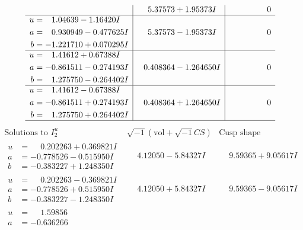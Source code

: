 \documentclass[1p]{elsarticle_modified}
\theoremstyle{definition}
\newcommand{\I}{\sqrt{-1}}
\begin{document}
$$\begin{array}{c|c|c}
 & \phantom{-}5.37573 + 1.95373 I & \phantom{-0.000000 } 0 \\ \hline\begin{aligned}
u &= \phantom{-}1.04639 - 1.16420 I \\
a &= \phantom{-}0.930949 - 0.477625 I \\
b &= -1.221710 + 0.070295 I\end{aligned}
 & \phantom{-}5.37573 - 1.95373 I & \phantom{-0.000000 } 0 \\ \hline\begin{aligned}
u &= \phantom{-}1.41612 + 0.67388 I \\
a &= -0.861511 - 0.274193 I \\
b &= \phantom{-}1.275750 - 0.264402 I\end{aligned}
 & \phantom{-}0.408364 - 1.264650 I & \phantom{-0.000000 } 0 \\ \hline\begin{aligned}
u &= \phantom{-}1.41612 - 0.67388 I \\
a &= -0.861511 + 0.274193 I \\
b &= \phantom{-}1.275750 + 0.264402 I\end{aligned}
 & \phantom{-}0.408364 + 1.264650 I & \phantom{-0.000000 } 0\\
 \hline 
 \end{array}$$\newpage$$\begin{array}{c|c|c}  
\text{Solutions to }I^u_{2}& \I (\text{vol} + \sqrt{-1}CS) & \text{Cusp shape}\\
 \hline 
\begin{aligned}
u &= \phantom{-}0.202263 + 0.369821 I \\
a &= -0.778526 - 0.515950 I \\
b &= -0.383227 + 1.248350 I\end{aligned}
 & \phantom{-}4.12050 - 5.84327 I & \phantom{-}9.59365 + 9.05617 I \\ \hline\begin{aligned}
u &= \phantom{-}0.202263 - 0.369821 I \\
a &= -0.778526 + 0.515950 I \\
b &= -0.383227 - 1.248350 I\end{aligned}
 & \phantom{-}4.12050 + 5.84327 I & \phantom{-}9.59365 - 9.05617 I \\ \hline\begin{aligned}
u &= \phantom{-}1.59856\phantom{ +0.000000I} \\
a &= -0.636266\phantom{ +0.000000I} \\

\end{aligned}
\end{array}$$
\end{document}
